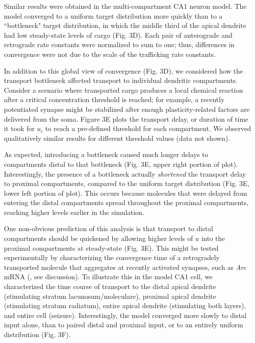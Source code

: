 \documentclass[fleqn,10pt]{wlpeerj}
\begin{document}
Similar results were obtained in the multi-compartment CA1 neuron model. The model converged to a uniform target distribution more quickly than to a ``bottleneck" target distribution, in which the middle third of the apical dendrite had low steady-state levels of cargo (Fig. 3D). Each pair of anterograde and retrograde rate constants were normalized to sum to one; thus, differences in convergence were not due to the scale of the trafficking rate constants.

In addition to this global view of convergence (Fig. 3D), we considered how the transport bottleneck affected transport to individual dendritic compartments. Consider a scenario where transported cargo produces a local chemical reaction after a critical concentration threshold is reached; for example, a recently potentiated synapse might be stabilized after enough plasticity-related factors are delivered from the soma. Figure 3E plots the transport delay, or duration of time it took for $u_i$ to reach a pre-defined threshold for each compartment. We observed qualitatively similar results for different threshold values (data not shown).

As expected, introducing a bottleneck caused much longer delays to compartments distal to that bottleneck (Fig. 3E, upper right portion of plot). Interestingly, the presence of a bottleneck actually \textit{shortened} the transport delay to proximal compartments, compared to the uniform target distribution (Fig. 3E, lower left portion of plot). This occurs because molecules that were delayed from entering the distal compartments spread throughout the proximal compartments, reaching higher levels earlier in the simulation.

One non-obvious prediction of this analysis is that transport to distal compartments should be quickened by allowing higher levels of $u$ into the proximal compartments at steady-state (Fig. 3E). This might be tested experimentally by characterizing the convergence time of a retrogradely transported molecule that aggregates at recently activated synapses, such as \textit{Arc} mRNA (\cite{Steward_1998}, see discussion). To illustrate this in the model CA1 cell, we characterized the time course of transport to the distal apical dendrite (stimulating stratum lacunosum/moleculare), proximal apical dendrite (stimulating stratum radiatum), entire apical dendrite (stimulating both layers), and entire cell (seizure). Interestingly, the model converged more slowly to distal input alone, than to paired distal and proximal input, or to an entirely uniform distribution (Fig. 3F).
\end{document}
